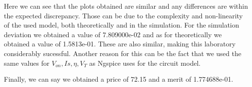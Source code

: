 Here we can see that the plots obtained are similar and any differences are within the expected discrepancy. Those can be due to the complexity and non-linearity of the used model, both theoretically and in the simulation. For the simulation deviation we obtained a value of 7.809000e-02 and as for theoretically we obtained a value of 1.5813e-01. These are also similar, making this laboratory considerably sucessful. Another reason for this can be the fact that we used the same values for $V_{on}, Is, \eta, V_{T}$ as Ngspice uses for the circuit model.

Finally, we can say we obtained a price of 72.15 and a merit of 1.774688e-01.

